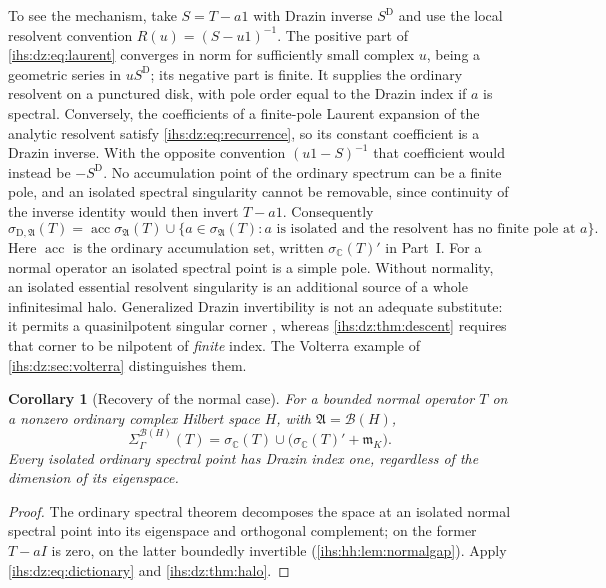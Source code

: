 \documentclass[11pt,a4paper]{article}
\numberwithin{equation}{section}
\newtheorem{corollary}[corollary]{Corollary}
\theoremstyle{definition}
\theoremstyle{remark}
\newcommand{\C}{\mathbb C}
\newcommand{\mK}{\mathfrak m_K}
\newcommand{\B}{\mathcal B(H)}
\newcommand{\Alg}{\mathfrak A}
\newcommand{\sigD}{\sigma_{\mathrm D,\Alg}}
\newcommand{\acc}{\operatorname{acc}}
\begin{document}
To see the mechanism, take $S=T-a1$ with Drazin inverse $S^{\mathrm D}$ and
use the local resolvent convention $R(u)=(S-u1)^{-1}$. The
positive part of \eqref{ihs:dz:eq:laurent} converges in norm for
sufficiently small complex $u$, being a geometric series in $uS^{\mathrm D}$;
its negative part is finite. It supplies the ordinary resolvent on a
punctured disk, with pole order equal to the Drazin index if $a$ is
spectral. Conversely, the coefficients of a finite-pole Laurent expansion of
the analytic resolvent satisfy \eqref{ihs:dz:eq:recurrence}, so its constant
coefficient is a Drazin inverse. With the opposite convention
$(u1-S)^{-1}$ that coefficient would instead be $-S^{\mathrm D}$.
No accumulation point of the ordinary
spectrum can be a finite pole, and an isolated spectral singularity cannot be
removable, since continuity of the inverse identity would then invert
$T-a1$. Consequently
\begin{equation}\label{ihs:dz:eq:dictionary}
 \sigD(T)=\acc\sigma_\Alg(T)\cup
 \{a\in\sigma_\Alg(T):a\text{ is isolated and the resolvent has no finite
 pole at }a\}.
\end{equation}
Here $\acc$ is the ordinary accumulation set, written $\sigma_\C(T)'$ in
Part~I. For a normal operator an isolated spectral point is a simple pole.
Without normality, an isolated essential resolvent singularity is an
additional source of a whole infinitesimal halo. Generalized Drazin
invertibility is not an adequate substitute: it permits a quasinilpotent
singular corner \cite{Koliha}, whereas \cref{ihs:dz:thm:descent} requires
that corner to be nilpotent of \emph{finite} index. The Volterra example of
\cref{ihs:dz:sec:volterra} distinguishes them.

\begin{corollary}[Recovery of the normal case]\label{ihs:dz:cor:normal}
For a bounded normal operator $T$ on a nonzero ordinary complex Hilbert space
$H$, with $\Alg=\B$,
\[
 \Sigma^{\B}_\Gamma(T)=\sigma_\C(T)\cup\bigl(\sigma_\C(T)'+\mK\bigr).
\]
Every isolated ordinary spectral point has Drazin index one, regardless of
the dimension of its eigenspace.
\end{corollary}
\begin{proof}
The ordinary spectral theorem decomposes the space at an isolated normal
spectral point into its eigenspace and orthogonal complement; on the former
$T-aI$ is zero, on the latter boundedly invertible
(\cref{ihs:hh:lem:normalgap}). Apply \eqref{ihs:dz:eq:dictionary} and
\cref{ihs:dz:thm:halo}.
\end{proof}
\end{document}
